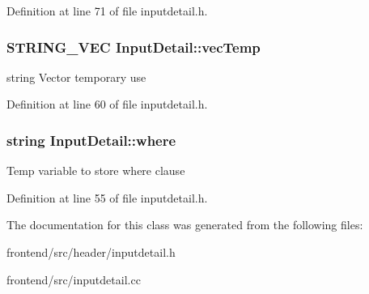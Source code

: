 \-Definition at line 71 of file inputdetail.\-h.

\hypertarget{classInputDetail_abee6a659eb2e34b260aaf8b05d6003b4}{
\subsubsection[{vec\-Temp}]{\setlength{\rightskip}{0pt plus 5cm}\-S\-T\-R\-I\-N\-G\-\_\-\-V\-E\-C {\bf \-Input\-Detail\-::vec\-Temp}}}\label{classInputDetail_abee6a659eb2e34b260aaf8b05d6003b4}
string \-Vector temporary use 

\-Definition at line 60 of file inputdetail.\-h.

\hypertarget{classInputDetail_a79d8a59940f25f4d2089e241c71a4279}{
\subsubsection[{where}]{\setlength{\rightskip}{0pt plus 5cm}string {\bf \-Input\-Detail\-::where}}}\label{classInputDetail_a79d8a59940f25f4d2089e241c71a4279}
\-Temp variable to store where clause 

\-Definition at line 55 of file inputdetail.\-h.



\-The documentation for this class was generated from the following files\-:\begin{DoxyCompactItemize}
\item 
frontend/src/header/inputdetail.\-h\item 
frontend/src/inputdetail.\-cc\end{DoxyCompactItemize}
